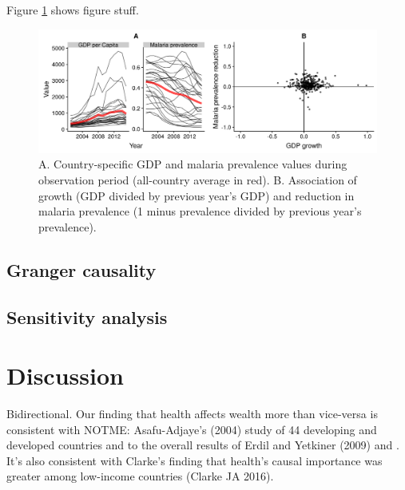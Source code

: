 \documentclass[9pt,twocolumn,twoside,lineno]{pnas-new}
\begin{document}
Figure \ref{fig:descriptive} shows figure stuff.


\begin{figure}%
\centering
\includegraphics[width=.9\linewidth]{../figures/descriptive}
\caption{A. Country-specific GDP and malaria prevalence values during observation period (all-country average in red). B. Association of growth (GDP divided by previous year's GDP) and reduction in malaria prevalence (1 minus prevalence divided by previous year's prevalence).}
\label{fig:descriptive}
\end{figure}






\subsection*{Granger causality}


\subsection*{Sensitivity analysis}

\section*{Discussion}

Bidirectional. Our finding that health affects wealth more than vice-versa is consistent with NOTME: Asafu-Adjaye’s (2004) study of 44 developing and developed countries and to the overall results of Erdil and Yetkiner (2009) and . It’s also consistent with Clarke’s finding that health’s causal importance was greater among low-income countries (Clarke JA 2016).
\end{document}
